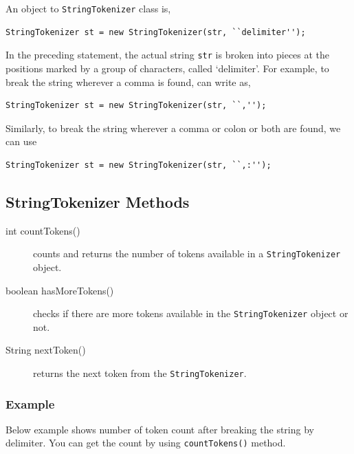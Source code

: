 \documentclass[11pt,a4paper]{article}
\begin{document}
An object to \texttt{StringTokenizer} class is,
\begin{lstlisting}[numbers=none]
StringTokenizer st = new StringTokenizer(str, ``delimiter'');
\end{lstlisting}
In the preceding statement, the actual string \texttt{str} is broken into pieces at the positions marked by a group of characters, called `delimiter'. For example, to break the string wherever a comma is found, can write as,
\begin{lstlisting}[numbers=none]
StringTokenizer st = new StringTokenizer(str, ``,'');
\end{lstlisting}
Similarly, to break the string wherever a comma or colon or both are found, we can use
\begin{lstlisting}[numbers=none]
StringTokenizer st = new StringTokenizer(str, ``,:'');
\end{lstlisting}
\subsection*{StringTokenizer Methods}
\begin{description}
\item [int countTokens()] counts and returns the number of tokens available in a \texttt{StringTokenizer} object.

\item [boolean hasMoreTokens()] checks if there are more tokens available in the \texttt{StringTokenizer} object or not. 

\item [String nextToken()] returns the next token from the \texttt{StringTokenizer}.
\end{description}
\subsubsection*{Example}
Below example shows number of token count after breaking the string by delimiter. You can get the count by using \texttt{countTokens()} method.

\end{document}
